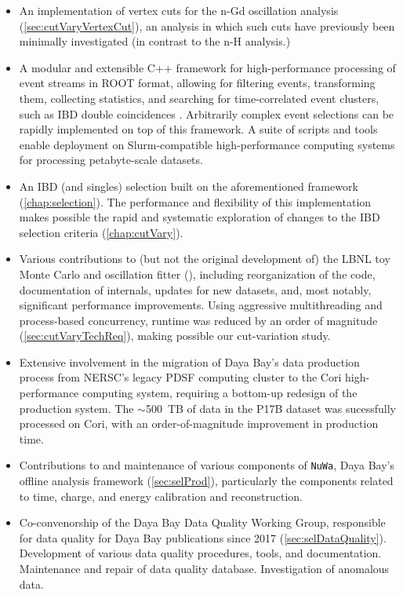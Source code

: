 \documentclass[../thesis.tex]{subfiles}
\begin{document}
\begin{itemize}
\item An implementation of vertex cuts for the n-Gd oscillation analysis (\autoref{sec:cutVaryVertexCut}), an analysis in which such cuts have previously been minimally investigated (in contrast to the n-H analysis.)
\item A modular and extensible C++ framework for high-performance processing of event streams in ROOT format, allowing for filtering events, transforming them, collecting statistics, and searching for time-correlated event clusters, such as IBD double coincidences \cite{SelectorFramework}. Arbitrarily complex event selections can be rapidly implemented on top of this framework. A suite of scripts and tools enable deployment on Slurm-compatible high-performance computing systems for processing petabyte-scale datasets.
\item An IBD (and singles) selection \cite{IbdSel} built on the aforementioned framework (\autoref{chap:selection}). The performance and flexibility of this implementation makes possible the rapid and systematic exploration of changes to the IBD selection criteria (\autoref{chap:cutVary}).
\item Various contributions to (but not the original development of) the LBNL toy Monte Carlo and oscillation fitter (), including reorganization of the code, documentation of internals, updates for new datasets, and, most notably, significant performance improvements. Using aggressive multithreading and process-based concurrency, runtime was reduced by an order of magnitude (\autoref{sec:cutVaryTechReq}), making possible our cut-variation study.
\item Extensive involvement in the migration of Daya Bay's data production process from NERSC's legacy PDSF computing cluster to the Cori high-performance computing system, requiring a bottom-up redesign of the production system. The $\sim$500~TB of data in the P17B dataset was sucessfully processed on Cori, with an order-of-magnitude improvement in production time.
\item Contributions to and maintenance of various components of \texttt{NuWa}, Daya Bay's offline analysis framework (\autoref{sec:selProd}), particularly the components related to time, charge, and energy calibration and reconstruction.
\item Co-convenorship of the Daya Bay Data Quality Working Group, responsible for data quality for Daya Bay publications since 2017 (\autoref{sec:selDataQuality}). Development of various data quality procedures, tools, and documentation. Maintenance and repair of data quality database. Investigation of anomalous data.

\end{itemize}
\end{document}

